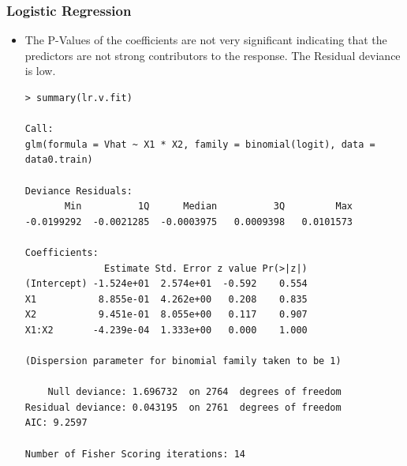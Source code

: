 \documentclass[twoside,12pt]{article}
\begin{document}
\subsubsection{Logistic Regression}
\begin{itemize}
\item
The P-Values of the coefficients are not very significant indicating that the predictors are not strong contributors to the response. The Residual deviance is low.
\begin{verbatim}
> summary(lr.v.fit)

Call:
glm(formula = Vhat ~ X1 * X2, family = binomial(logit), data = data0.train)

Deviance Residuals: 
       Min          1Q      Median          3Q         Max  
-0.0199292  -0.0021285  -0.0003975   0.0009398   0.0101573  

Coefficients:
              Estimate Std. Error z value Pr(>|z|)
(Intercept) -1.524e+01  2.574e+01  -0.592    0.554
X1           8.855e-01  4.262e+00   0.208    0.835
X2           9.451e-01  8.055e+00   0.117    0.907
X1:X2       -4.239e-04  1.333e+00   0.000    1.000

(Dispersion parameter for binomial family taken to be 1)

    Null deviance: 1.696732  on 2764  degrees of freedom
Residual deviance: 0.043195  on 2761  degrees of freedom
AIC: 9.2597

Number of Fisher Scoring iterations: 14



\end{verbatim}


\end{itemize}
\end{document}
